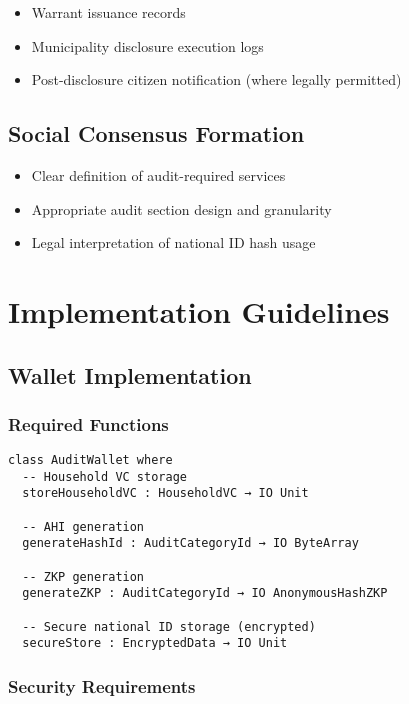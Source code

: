 \begin{itemize}
  \item Warrant issuance records
  \item Municipality disclosure execution logs
  \item Post-disclosure citizen notification (where legally permitted)
\end{itemize}

\subsection{Social Consensus Formation}

\begin{itemize}
  \item Clear definition of audit-required services
  \item Appropriate audit section design and granularity
  \item Legal interpretation of national ID hash usage
\end{itemize}

\section{Implementation Guidelines}

\subsection{Wallet Implementation}

\subsubsection{Required Functions}

\begin{verbatim}
class AuditWallet where
  -- Household VC storage
  storeHouseholdVC : HouseholdVC → IO Unit

  -- AHI generation
  generateHashId : AuditCategoryId → IO ByteArray

  -- ZKP generation
  generateZKP : AuditCategoryId → IO AnonymousHashZKP

  -- Secure national ID storage (encrypted)
  secureStore : EncryptedData → IO Unit
\end{verbatim}

\subsubsection{Security Requirements}


